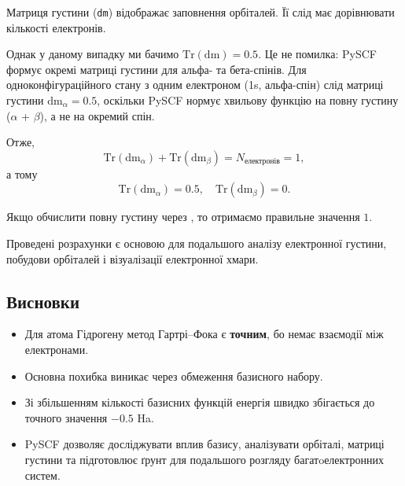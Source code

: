 Матриця густини (\texttt{dm}) відображає заповнення орбіталей. Її слід має дорівнювати кількості електронів.
\begin{commentbox}
Однак у даному випадку ми бачимо $\mathrm{Tr}(\mathrm{dm}) = 0.5$.
Це не помилка: PySCF формує окремі матриці густини для альфа- та бета-спінів.
Для одноконфігураційного стану з одним електроном (1s, альфа-спін) слід матриці густини $\mathrm{dm}_\alpha = 0.5$, оскільки PySCF нормує хвильову функцію на повну густину ($\alpha$ + $\beta$), а не на окремий спін.

Отже,
\[
\mathrm{Tr}(\mathrm{dm}_\alpha) + \mathrm{Tr}(\mathrm{dm}_\beta) = N_{\text{електронів}} = 1,
\]
а тому
\[
\mathrm{Tr}(\mathrm{dm}_\alpha) = 0.5, \quad \mathrm{Tr}(\mathrm{dm}_\beta) = 0.
\]

Якщо обчислити повну густину через , то отримаємо правильне значення $1$.

\end{commentbox}
Проведені розрахунки є основою для подальшого аналізу електронної густини, побудови орбіталей і візуалізації електронної хмари.


\subsection{Висновки}

\begin{itemize}
    \item Для атома Гідрогену метод Гартрі–Фока є \textbf{точним}, бо немає взаємодії між електронами.
    \item Основна похибка виникає через обмеження базисного набору.
    \item Зі збільшенням кількості базисних функцій енергія швидко збігається до точного значення \(-0.5\) Ha.
    \item PySCF дозволяє досліджувати вплив базису, аналізувати орбіталі, матриці густини та підготовлює ґрунт для подальшого розгляду багатoелектронних систем.
\end{itemize}